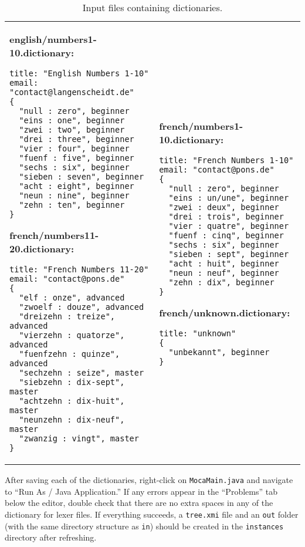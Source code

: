 \begin{table}
\begin{tabular}{p{6cm} p{6cm} }
\footnotesize
\textbf{english/numbers1-10.dictionary:}
\begin{verbatim}
title: "English Numbers 1-10"
email: "contact@langenscheidt.de"	
{
  "null : zero", beginner
  "eins : one", beginner
  "zwei : two", beginner
  "drei : three", beginner
  "vier : four", beginner
  "fuenf : five", beginner
  "sechs : six", beginner
  "sieben : seven", beginner
  "acht : eight", beginner
  "neun : nine", beginner
  "zehn : ten", beginner 
}
\end{verbatim} 

\footnotesize
\textbf{french/numbers11-20.dictionary:}
\begin{verbatim}
title: "French Numbers 11-20"
email: "contact@pons.de"	
{
  "elf : onze", advanced
  "zwoelf : douze", advanced
  "dreizehn : treize", advanced
  "vierzehn : quatorze", advanced
  "fuenfzehn : quinze", advanced
  "sechzehn : seize", master
  "siebzehn : dix-sept", master
  "achtzehn : dix-huit", master
  "neunzehn : dix-neuf", master
  "zwanzig : vingt", master
}
\end{verbatim}
&

\footnotesize
\textbf{french/numbers1-10.dictionary:}
\begin{verbatim}   
title: "French Numbers 1-10"
email: "contact@pons.de"	
{
  "null : zero", beginner
  "eins : un/une", beginner
  "zwei : deux", beginner
  "drei : trois", beginner
  "vier : quatre", beginner
  "fuenf : cinq", beginner
  "sechs : six", beginner
  "sieben : sept", beginner
  "acht : huit", beginner
  "neun : neuf", beginner
  "zehn : dix", beginner 
}
\end{verbatim}

\footnotesize
\textbf{french/unknown.dictionary:}
\begin{verbatim}
title: "unknown"
{
  "unbekannt", beginner
}
\end{verbatim}
  \\
\end{tabular}   
\caption{Input files containing dictionaries.}
\label{moca-inputdata}

\end{table}   

After saving each of the dictionaries, right-click on \texttt{MocaMain.java} and navigate to ``Run As / Java Application.'' If any errors appear in the
``Problems'' tab below the editor, double check that there are no extra spaces in any of the dictionary for lexer files. If everything succeeds, a
\texttt{tree.xmi} file and an \texttt{out} folder (with the same directory structure as \texttt{in}) should be created in the \texttt{instances} directory after
refreshing.

